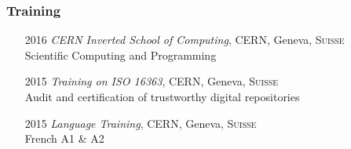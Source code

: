 \documentclass[12pt,a4paper]{article}
\begin{document}
\subsubsection*{Training}
\begin{itemize}
	\item[2016] \emph{CERN Inverted School of Computing},  {CERN}, Geneva,
		\textsc{Suisse}\\
	{\small Scientific Computing and Programming}
	\item[2015] \emph{Training on ISO 16363}, {CERN}, Geneva, \textsc{Suisse}\\
	{\small Audit and certification of trustworthy digital repositories}
	\item[2015] \emph{Language Training}, {CERN}, Geneva, \textsc{Suisse}\\
	{\small French A1 \& A2}
\end{itemize}
\end{document}
